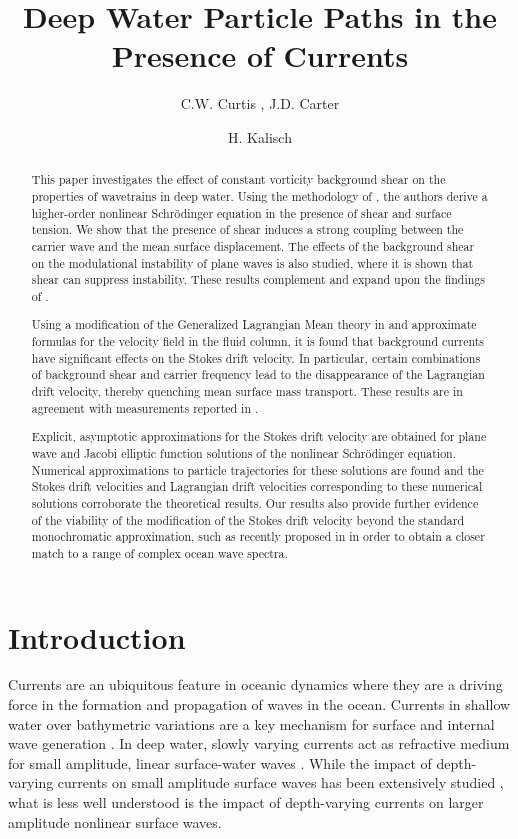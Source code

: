\documentclass{JFM_Style/jfm}
\title{Deep Water Particle Paths in the Presence of Currents}
\date{}
\author{C.W. Curtis \aff{1}
  \corresp{\email{ccurtis@mail.sdsu.edu}}, J.D. Carter\aff{2} \and H. Kalisch\aff{3}}
\affiliation{\aff{1}Department of Mathematics and Statistics, San Diego State University, San Diego, CA 92182
\aff{2}Mathematics Department, Seattle University, Seattle, WA 98122
\aff{3}Department of Mathematics, University of Bergen, Bergen, Norway
}
\begin{document}
\maketitle

\begin{abstract}
This paper investigates the effect of constant vorticity background shear on the properties of wavetrains in deep water. Using the methodology of \cite{fokas2008},
the authors derive a higher-order nonlinear Schr\"{o}dinger equation in the presence of shear and surface tension.  We show that the presence of shear induces a strong coupling between the carrier wave and the mean surface displacement.  The effects of the background shear on the modulational instability of plane waves is also studied, where it is shown that shear can suppress instability.  These results complement and expand upon the findings of \cite{thomas2012nonlinear}.

Using a modification of the Generalized Lagrangian Mean theory in  \cite{andrews} and approximate formulas for the velocity field in the fluid column,
it is found that background currents have significant effects on the Stokes drift velocity. In particular, certain combinations of background shear and carrier frequency lead to the disappearance of the Lagrangian drift velocity, thereby quenching mean surface mass transport.  These results
are in agreement with measurements reported in \cite{smith}.

Explicit, asymptotic approximations for the Stokes drift velocity are obtained for plane wave and Jacobi elliptic function solutions of the nonlinear Schr\"odinger equation.  Numerical approximations to particle trajectories for these solutions are found and the Stokes drift velocities and Lagrangian drift velocities corresponding to these numerical solutions corroborate the theoretical results.  Our results also provide further evidence of the viability of the modification of the Stokes drift velocity beyond the standard monochromatic approximation, such as recently proposed in \cite{breivik} in order to obtain a closer match to a range of complex ocean wave spectra.
\end{abstract}

\section{Introduction}

Currents are an ubiquitous feature in oceanic dynamics where they are a driving force in the formation and propagation of waves in the ocean.  Currents in shallow water over bathymetric variations are a key mechanism for surface and internal wave generation \cite{helfrich}.  In deep water, slowly varying currents act as refractive medium for small amplitude, linear surface-water waves \cite{young}.  While the impact of depth-varying currents on small amplitude surface waves has been extensively studied \cite{craik1,craik2,craik3,craik4,phillips1,phillips2}, what is less well understood is the impact of depth-varying currents on larger amplitude nonlinear surface waves. 
\end{document}
